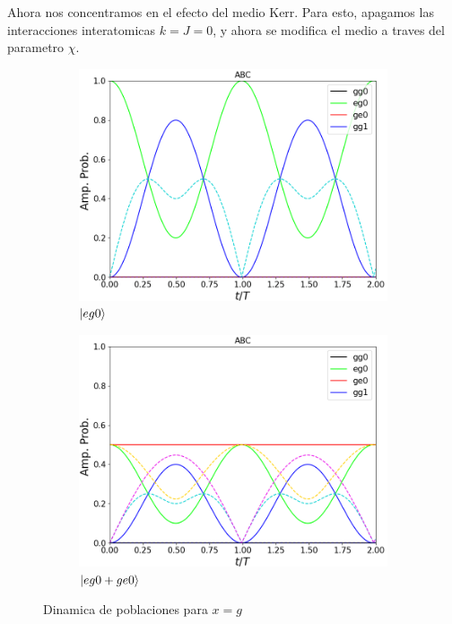 Ahora nos concentramos en el efecto del medio Kerr. Para esto, apagamos las interacciones interatomicas $k=J=0$, y ahora se modifica el medio a traves del parametro $\chi$. 
\begin{figure}[h]
    \centering
    \begin{subfigure}{0.49\textwidth}
        \includegraphics[width=\textwidth]{figuras/ch4/x eg0 abc.png}
        \caption{$\ket{eg0}$}
        \label{fig4:pob x eg0}
    \end{subfigure}
    \hfill
    \begin{subfigure}{0.49\textwidth}
        \includegraphics[width=\textwidth]{figuras/ch4/x eg0+ abc.png}
        \caption{$\ket{eg0+ge0}$}
        \label{fig4:pob x eg0 sim}
    \end{subfigure}
    \caption{Dinamica de poblaciones para $x=g$}
    \label{fig4:pob x}
\end{figure}

